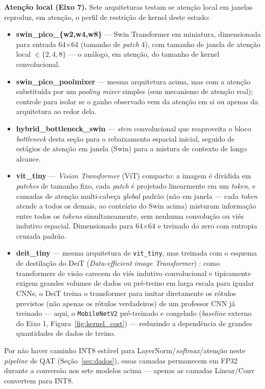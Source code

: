 \documentclass[conference]{IEEEtran}
\begin{document}
\textbf{Atenção local (Eixo 7).} Sete arquiteturas testam se atenção local em janelas
reproduz, em atenção, o perfil de restrição de kernel deste estudo:
\begin{itemize}
\item \textbf{swin\_pico\_\{w2,w4,w8\}} — Swin Transformer \cite{liu2021swin} em miniatura,
dimensionada para entrada 64$\times$64 (tamanho de \textit{patch} 4), com tamanho de janela de atenção
local $\in\{2,4,8\}$ — o análogo, em atenção, do tamanho de kernel convolucional.
\item \textbf{swin\_pico\_poolmixer} — mesma arquitetura acima, mas com a atenção substituída por
um \textit{pooling mixer} simples (sem mecanismo de atenção real); controle para isolar se o ganho
observado vem da atenção em si ou apenas da arquitetura ao redor dela.
\item \textbf{hybrid\_bottleneck\_swin} — \textit{stem} convolucional que reaproveita o bloco
\textit{bottleneck} desta seção para o rebaixamento espacial inicial, seguido de estágios de
atenção em janela (Swin) para a mistura de contexto de longo alcance.
\item \textbf{vit\_tiny} — \textit{Vision Transformer} (ViT) \cite{dosovitskiy2020vit} compacto: a
imagem é dividida em \textit{patches} de tamanho fixo, cada \textit{patch} é projetado linearmente
em um \textit{token}, e camadas de atenção multi-cabeça \emph{global} padrão (não em janela — cada
\textit{token} atende a todos os demais, ao contrário do Swin acima) misturam informação entre
todos os \textit{tokens} simultaneamente, sem nenhuma convolução ou viés indutivo espacial.
Dimensionado para 64$\times$64 e treinado do zero com entropia cruzada padrão.
\item \textbf{deit\_tiny} — mesma arquitetura de \texttt{vit\_tiny}, mas treinada com o esquema de
destilação do DeiT (\textit{Data-efficient image Transformer}) \cite{touvron2021distillation}:
como transformers de visão carecem do viés indutivo convolucional e tipicamente exigem grandes
volumes de dados ou pré-treino em larga escala para igualar CNNs, o DeiT treina o transformer para
imitar diretamente os rótulos previstos (não apenas os rótulos verdadeiros) de um professor CNN já
treinado — aqui, o \texttt{MobileNetV2} pré-treinado e congelado (\textit{baseline} externo do
Eixo 1, Figura~\ref{fig:kernel_cost}) — reduzindo a dependência de grandes quantidades de
dados de treino.
\end{itemize}
Por não haver caminho INT8 estável para LayerNorm/\textit{softmax}/atenção neste \textit{pipeline}
de QAT (Seção~\ref{sec:dados}), essas camadas permanecem em FP32 durante a conversão nos sete
modelos acima — apenas as camadas Linear/Conv convertem para INT8.
\end{document}
